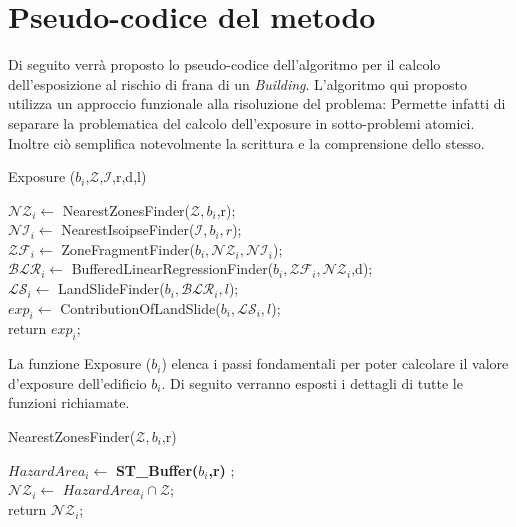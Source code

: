 
\chapter{Pseudo-codice del metodo} %

\label{ch:name} %
Di seguito verrà proposto lo pseudo-codice dell'algoritmo per il calcolo dell'esposizione al rischio di frana di un \textit{Building}. L'algoritmo qui proposto utilizza un approccio funzionale alla risoluzione del problema: Permette infatti di separare la problematica del calcolo dell'exposure in sotto-problemi atomici. Inoltre ciò semplifica notevolmente la scrittura e la comprensione dello stesso.



\begin{algorithm}[H]
	
	
	\IncMargin{1em}
	\caption{Exposure ($b_i$,$\mathcal{Z}$,$\mathcal{I}$,r,d,l)}
	\label{alg:0}
	\BlankLine
	
	\SetAlgoNoLine
	$ \mathcal{NZ}_i \leftarrow$ NearestZonesFinder($\mathcal{Z},b_i$,r); \\
	$ \mathcal{NI}_i \leftarrow$ NearestIsoipseFinder($\mathcal{I},b_i,r$); \\
	$ \mathcal{ZF}_i \leftarrow$ ZoneFragmentFinder($b_i , \mathcal{NZ}_i, \mathcal{NI}_i $);  \\
	$ \mathcal{BLR}_i \leftarrow $ BufferedLinearRegressionFinder($b_i,\mathcal{ZF}_i,\mathcal{NZ}_i$,d); \\
	$ \mathcal{LS}_i \leftarrow $ LandSlideFinder($b_i , \mathcal{BLR}_i, l$); \\
	$ exp_i \leftarrow$ ContributionOfLandSlide($b_i, \mathcal{LS}_i, l$);\\
	return $ exp_i $;
	
	
\end{algorithm}
La funzione Exposure ($b_i$) elenca i passi fondamentali per poter calcolare il  valore d'exposure dell'edificio $b_i$. Di seguito verranno esposti i dettagli di tutte le funzioni richiamate.

\begin{algorithm}[H]
	
	\IncMargin{1em}
	\caption{NearestZonesFinder($\mathcal{Z},b_i$,r)}
	\label{alg:1}
	\BlankLine
	\SetAlgoNoLine
	$ HazardArea_i  \leftarrow $ \textbf{ST\_Buffer($b_i$,r)} ; \\ 
	$ \mathcal{NZ}_i  \leftarrow $ $HazardArea_i \cap \mathcal{Z}$; \\
	return $\mathcal{NZ}_i$;
	
\end{algorithm}

